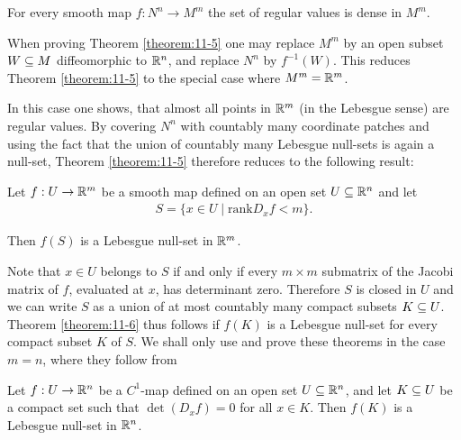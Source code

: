\begin{theorem}\label{theorem:11-5}
  For every smooth map $f: N^n \to M^m$ the set of regular values is dense in $M^m$.
\end{theorem}

When proving Theorem \ref{theorem:11-5} one may replace $M^m$ by an open subset $W\subseteq M$
diffeomorphic to ${\mathbb{R}}^n$, and replace $N^n$ by $f^{-1}(W)$. This reduces Theorem \ref{theorem:11-5}
to the special case where $M^m = {\mathbb{R}}^m$.

In this case one shows, that almost all points in ${\mathbb{R}}^m$ (in the Lebesgue sense) are
regular values. By covering $N^n$ with countably many coordinate patches and
using the fact that the union of countably many Lebesgue null-sets is again a
null-set, Theorem \ref{theorem:11-5} therefore reduces to the following result:

\begin{theorem}[Sard, 1942]\label{theorem:11-6}
  Let $f:U\to{\ensuremath{\mathbb{R}}}^m$ be a smooth map defined on an open set $U\subseteq{\ensuremath{\mathbb{R}}}^n$ and let
  \begin{align*}
    S = \{x\in U\mid \text{rank} D_xf < m\}.
  \end{align*}

  Then $f(S)$ is a Lebesgue null-set in ${\mathbb{R}}^m$.
\end{theorem}

Note that $x\in U$ belongs to $S$ if and only if every $m\times m$ submatrix of the Jacobi
matrix of $f$, evaluated at $x$, has determinant zero. Therefore $S$ is closed in $U$ and
we can write $S$ as a union of at most countably many compact subsets $K\subseteq U$.
Theorem \ref{theorem:11-6} thus follows if $f(K)$ is a Lebesgue null-set for every compact
subset $K$ of $S$. We shall only use and prove these theorems in the case $m = n$,
where they follow from

\begin{proposition}\label{prop:11-7}
  Let $f:U\to {\ensuremath{\mathbb{R}}}^n$ be a $C^1$-map defined on an open set $U\subseteq {\ensuremath{\mathbb{R}}}^n$,
and let $K\subseteq U$ be a compact set such that $\det(D_xf) = 0$ for all $x\in K$. Then
$f(K)$ is a Lebesgue null-set in ${\mathbb{R}}^n$.
\end{proposition}

